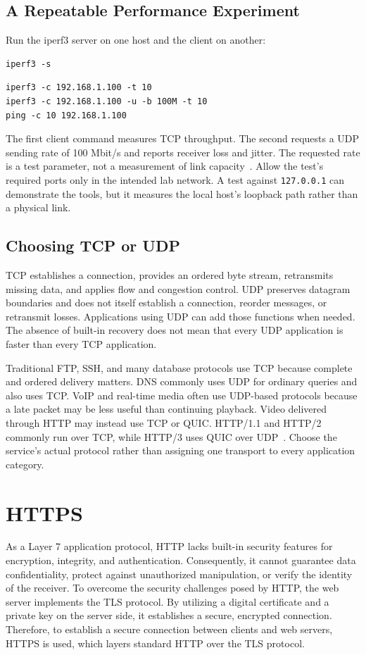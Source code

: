 \documentclass[journal]{IEEEtran}
\begin{document}
\subsection{A Repeatable Performance Experiment}
Run the iperf3 server on one host and the client on another:
\begin{lstlisting}
iperf3 -s
\end{lstlisting}
\begin{lstlisting}
iperf3 -c 192.168.1.100 -t 10
iperf3 -c 192.168.1.100 -u -b 100M -t 10
ping -c 10 192.168.1.100
\end{lstlisting}
The first client command measures TCP throughput. The second requests a UDP sending rate of 100 Mbit/s and reports receiver loss and jitter. The requested rate is a test parameter, not a measurement of link capacity~\cite{iperf}. Allow the test's required ports only in the intended lab network. A test against \texttt{127.0.0.1} can demonstrate the tools, but it measures the local host's loopback path rather than a physical link.

\subsection{Choosing TCP or UDP}
TCP establishes a connection, provides an ordered byte stream, retransmits missing data, and applies flow and congestion control. UDP preserves datagram boundaries and does not itself establish a connection, reorder messages, or retransmit losses. Applications using UDP can add those functions when needed. The absence of built-in recovery does not mean that every UDP application is faster than every TCP application.

Traditional FTP, SSH, and many database protocols use TCP because complete and ordered delivery matters. DNS commonly uses UDP for ordinary queries and also uses TCP. VoIP and real-time media often use UDP-based protocols because a late packet may be less useful than continuing playback. Video delivered through HTTP may instead use TCP or QUIC. HTTP/1.1 and HTTP/2 commonly run over TCP, while HTTP/3 uses QUIC over UDP~\cite{http3}. Choose the service's actual protocol rather than assigning one transport to every application category.

\section{HTTPS}

As a Layer 7 application protocol, HTTP lacks built-in security features for encryption, integrity, and authentication. Consequently, it cannot guarantee data confidentiality, protect against unauthorized manipulation, or verify the identity of the receiver. To overcome the security challenges posed by HTTP, the web server implements the TLS protocol. By utilizing a digital certificate and a private key on the server side, it establishes a secure, encrypted connection. Therefore, to establish a secure connection between clients and web servers, HTTPS is used, which layers standard HTTP over the TLS protocol.
\end{document}
